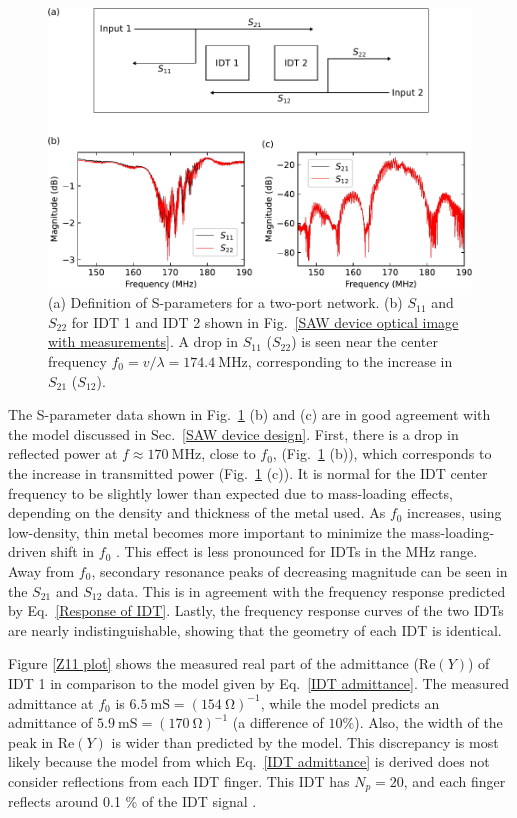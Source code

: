 \documentclass{beavtex_dub_edit}
\begin{document}
\begin{figure}
    \includegraphics[width = 1\textwidth]{S-parameters.pdf}
    \caption{(a) Definition of S-parameters for a two-port network. (b) $S_{11}$ and $S_{22}$ for IDT 1 and IDT 2 shown in Fig.\ \ref{SAW device optical image with measurements}. A drop in $S_{11}$ ($S_{22}$) is seen near the center frequency $f_0 = v/\lambda = \SI{174.4}{\mega\hertz}$, corresponding to the increase in $S_{21}$ ($S_{12}$).}
    \label{S-parameters}
\end{figure}
The S-parameter data shown in Fig.\ \ref{S-parameters} (b) and (c) are in good agreement with the model discussed in Sec.\ \ref{SAW device design}. First, there is a drop in reflected power at $f \approx \SI{170}{\mega\hertz}$, close to $f_0$, (Fig.\ \ref{S-parameters} (b)), which corresponds to the increase in transmitted power (Fig.\ \ref{S-parameters} (c)). It is normal for the IDT center frequency to be slightly lower than expected due to mass-loading effects, depending on the density and thickness of the metal used. As $f_0$ increases, using low-density, thin metal becomes more important to minimize the mass-loading-driven shift in $f_0$ \cite{chen_ultrahigh-frequency_2020}. This effect is less pronounced for IDTs in the MHz range. Away from $f_0$, secondary resonance peaks of decreasing magnitude can be seen in the $S_{21}$ and $S_{12}$ data. This is in agreement with the frequency response predicted by Eq.\ \ref{Response of IDT}. Lastly, the frequency response curves of the two IDTs are nearly indistinguishable, showing that the geometry of each IDT is identical. 

Figure \ref{Z11 plot} shows the measured real part of the admittance ($\mathrm{Re}(Y)$) of IDT 1 in comparison to the model given by Eq.\ \ref{IDT admittance}. The measured admittance at $f_0$ is $\SI{6.5}{\milli\siemens} = (\SI{154}{\ohm})^{-1}$, while the model predicts an admittance of $\SI{5.9}{\milli\siemens} = (\SI{170}{\ohm})^{-1}$ (a difference of $10\%$). Also, the width of the peak in $\mathrm{Re}(Y)$ is wider than predicted by the model. This discrepancy is most likely because the model from which Eq.\ \ref{IDT admittance} is derived does not consider reflections from each IDT finger. This IDT has $N_p = 20$, and each finger reflects around 0.1  \% of the IDT signal \cite[p.\ 140]{lane_integrating_2021}.
\end{document}
